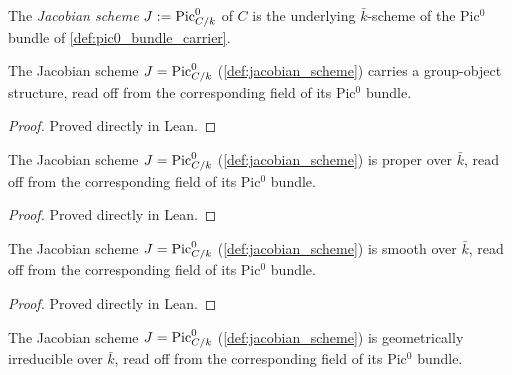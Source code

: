 \begin{definition}
  \label{def:jacobian_scheme}

  The \emph{Jacobian scheme} \(J := \operatorname{Pic}^0_{C/k}\) of \(C\) is the underlying
  \(\bar k\)-scheme of the Pic\(^0\) bundle of
  \cref{def:pic0_bundle_carrier}.
\end{definition}

\begin{lemma}
  \label{lem:jacobian_scheme_grpObj}

  The Jacobian scheme \(J = \operatorname{Pic}^0_{C/k}\) (\cref{def:jacobian_scheme})
  carries a group-object structure, read off from the corresponding field of
  its Pic\(^0\) bundle.
\end{lemma}

\begin{proof} Proved directly in Lean. \end{proof}

\begin{lemma}
  \label{lem:jacobian_scheme_isProper}

  The Jacobian scheme \(J = \operatorname{Pic}^0_{C/k}\) (\cref{def:jacobian_scheme}) is
  proper over \(\bar k\), read off from the corresponding field of its
  Pic\(^0\) bundle.
\end{lemma}

\begin{proof} Proved directly in Lean. \end{proof}

\begin{lemma}
  \label{lem:jacobian_scheme_smooth}

  The Jacobian scheme \(J = \operatorname{Pic}^0_{C/k}\) (\cref{def:jacobian_scheme}) is
  smooth over \(\bar k\), read off from the corresponding field of its
  Pic\(^0\) bundle.
\end{lemma}

\begin{proof} Proved directly in Lean. \end{proof}

\begin{lemma}
  \label{lem:jacobian_scheme_geomIrred}

  The Jacobian scheme \(J = \operatorname{Pic}^0_{C/k}\) (\cref{def:jacobian_scheme}) is
  geometrically irreducible over \(\bar k\), read off from the corresponding
  field of its Pic\(^0\) bundle.
\end{lemma}

